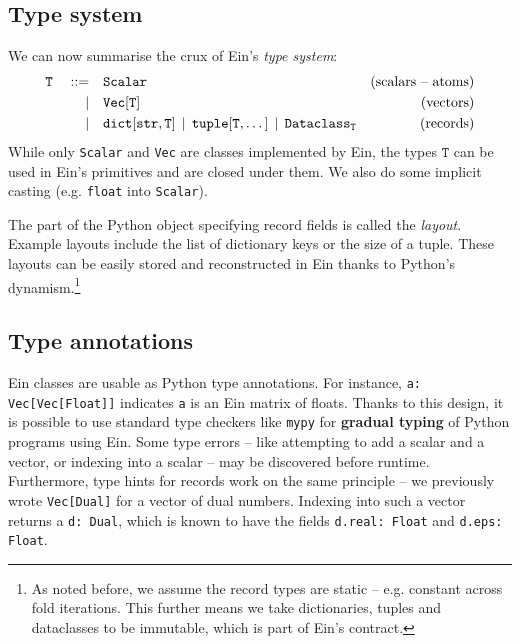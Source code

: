 \subsection{Type system}

We can now summarise the crux of Ein's \textit{type system}:
\begin{align*}
\texttt{T} \quad::=&\quad 
\text{\texttt{Scalar}}
& \text{(scalars -- atoms)} \\
\mid&\quad
\text{\texttt{Vec}}[\texttt{T}]
& \text{(vectors)} \\
\mid&\quad
\text{\texttt{dict}}[\text{\texttt{str}}, \texttt{T}] \,\mid\, \text{\texttt{tuple}}[\texttt{T}, \dots] \,\mid\, \texttt{Dataclass}_\texttt{T}
& \text{(records)}
\end{align*}
While only \texttt{Scalar} and \texttt{Vec} are classes implemented by Ein, the types $\texttt{T}$ can be used in Ein's primitives and are closed under them. We also do some implicit casting (e.g. \texttt{float} into \texttt{Scalar}).

The part of the Python object specifying record fields is called the \textit{layout}. Example layouts include the list of dictionary keys or the size of a tuple.
These layouts can be easily stored and reconstructed in Ein thanks to Python's dynamism.\footnote{As noted before, we assume the record types are static -- e.g. constant across fold iterations. This further means we take dictionaries, tuples and dataclasses to be immutable, which is part of Ein's contract.}

\subsection{Type annotations}

Ein classes are usable as Python type annotations. 
For instance, \texttt{a: Vec[Vec[Float]]} indicates \texttt{a} is an Ein matrix of floats. Thanks to this design, it is possible to use standard type checkers like \texttt{mypy} for \textbf{gradual typing} of Python programs using Ein. Some type errors -- like attempting to add a scalar and a vector, or indexing into a scalar -- may be discovered before runtime. Furthermore, type hints for records work on the same principle -- we previously wrote \texttt{Vec[Dual]} for a vector of dual numbers. Indexing into such a vector returns a \texttt{d: Dual}, which is known to have the fields \texttt{d.real: Float} and \texttt{d.eps: Float}.

